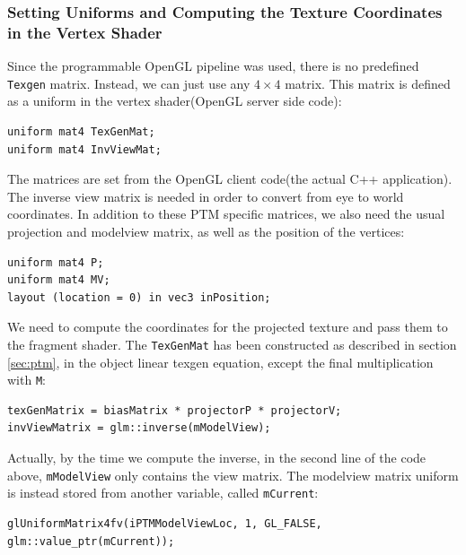 \documentclass[]{article}
\begin{document}
\subsubsection{Setting Uniforms and Computing the Texture Coordinates in the Vertex Shader}

Since the programmable OpenGL pipeline was used, there is no predefined \verb|Texgen| matrix. Instead, we can just use any $4 \times 4$ matrix. This matrix is defined as a uniform in the vertex shader(OpenGL server side code):
\begin{verbatim}
uniform mat4 TexGenMat;
uniform mat4 InvViewMat;
\end{verbatim}

The matrices are set from the OpenGL client code(the actual C++ application). The inverse view matrix is needed in order to convert from eye to world coordinates. In addition to these PTM specific matrices, we also need the usual projection and modelview matrix, as well as the position of the vertices:
\begin{verbatim}
uniform mat4 P;
uniform mat4 MV;
layout (location = 0) in vec3 inPosition;
\end{verbatim}

We need to compute the coordinates for the projected texture and pass them to the fragment shader. The \verb|TexGenMat| has been constructed as described in section \ref{sec:ptm}, in the object linear texgen equation, except the final multiplication with \verb|M|:
\begin{verbatim}
texGenMatrix = biasMatrix * projectorP * projectorV;
invViewMatrix = glm::inverse(mModelView);
\end{verbatim} 

Actually, by the time we compute the inverse, in the second line of the code above, \verb|mModelView| only contains the view matrix. The modelview matrix uniform is instead stored from another variable, called \verb|mCurrent|:
\begin{verbatim}
glUniformMatrix4fv(iPTMModelViewLoc, 1, GL_FALSE, 
glm::value_ptr(mCurrent));
\end{verbatim}
\end{document}
